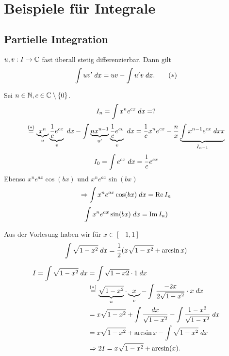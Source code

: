 \documentclass[../ana2u.tex]{subfiles}
\begin{document}
\setcounter{section}{2}

\section{Beispiele für Integrale}
\subsection{Partielle Integration}
\( u,v : I \rightarrow \mathbb{C} \) fast überall 
stetig differenzierbar.
Dann gilt
\[ \int uv' \; dx = uv - \int u'v \; dx. \tag{\(*\)} \]
\begin{bsp}
    Sei \( n\in\mathbb{N}, c\in\mathbb{C} \setminus \{0\} \).
    \[ I_n = \int x^n e^{cx} \; dx = ? \]
    \[ \overset{(*)}{=} \underbrace{x^n}_{u} 
    \underbrace{\frac{1}{c} e^{cx}}_{v} \; dx 
    - \int \underbrace{nx^{n-1}}_{u'} 
    \underbrace{\frac{1}{c} e^{cv}}_{v} \; dx
    = \frac{1}{c} x^n e^{cx} - \frac{n}{x} 
    \underbrace{\int x^{n-1} e^{cx} \; dx{x} }_{I_{n-1}} \]
    \[ I_0 = \int e^{cx} \; dx = \frac{1}{c} e^{cx} \]
    Ebenso \( x^n e^{ax} \cos(bx) \) und \( x^n e^{ax} \sin(bx) \)
    \[ \Rightarrow \int x^n e^{ax} \cos(bx) \; dx = \operatorname{{Re}} I_n \]
    \[ \int x^n e^{ax} \sin (bx) \; dx = \operatorname{Im} I_n) \]
\end{bsp}
Aus der Vorlesung haben wir für \( x \in [-1, 1] \)
\[ \int \sqrt{1-x^2} \; dx = \frac{1}{2} (x \sqrt{1-x^2} + \arcsin x) \]
\begin{bew}
    \begin{align*}
        I = \int \sqrt{1-x^2} \; dx 
        &= \int \sqrt{1-x2} \cdot 1 \; dx \\
        &\overset{(*)}{=} \underbrace{\sqrt{1-x^2}}_{u}
        \cdot \underbrace{x}_{v} - 
        \int \frac{-2x}{2\sqrt{1-x^2}} \cdot x \; dx \\
        &= x \sqrt{1-x^2} + \int \frac{dx}{\sqrt{1-x^2}} 
        - \int \frac{1-x^2}{\sqrt{1-x^2}} \; dx \\
        &= x \sqrt{1 - x^2} + \arcsin x 
        - \int \sqrt{1 - x^2} \; dx\\
        &\Rightarrow 2I = x \sqrt{1-x^2} + \arcsin(x).
    \end{align*}
\end{bew}
\end{document}
